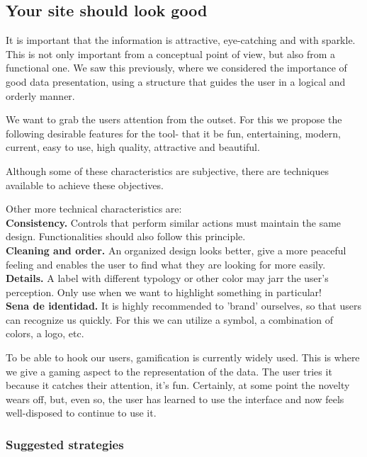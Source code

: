 \subsection{Your site should look good}

It is important that the information is attractive, eye-catching and with sparkle. This is not only important from a conceptual point of view, but also from a functional one. We saw this previously, where we considered the importance
of good data presentation, using a structure that guides the user in a logical and orderly manner.

We want to grab the users attention from the outset. For this we propose the following desirable features for the tool- that it be fun, entertaining,
modern, current, easy to use, high quality, attractive and beautiful.

Although some of these characteristics are subjective, there are techniques available to achieve these objectives.

Other more technical characteristics are: \\

\textbf{Consistency.} Controls that perform similar actions must maintain the same design. Functionalities
should also follow this principle. \\

\textbf{Cleaning and order.} An organized design looks better, give a more peaceful feeling and enables the user to find what they are looking for
more easily.\\

\textbf{Details.} A label with different typology or other color may jarr the user's perception. Only use when
we want to highlight something in particular! \\

\textbf{Sena de identidad.} It is highly recommended to 'brand' ourselves, so that users can recognize us quickly. For this we can utilize a symbol, a combination of colors, a logo, etc.

To be able to hook our users, gamification is currently widely used. This is where we give a gaming aspect to the representation of the data. The user tries it because it catches their attention, it's fun.
Certainly, at some point the novelty wears off, but, even so, the user has learned to use the interface and now feels well-disposed to continue to use it.

\subsubsection*{Suggested strategies}

